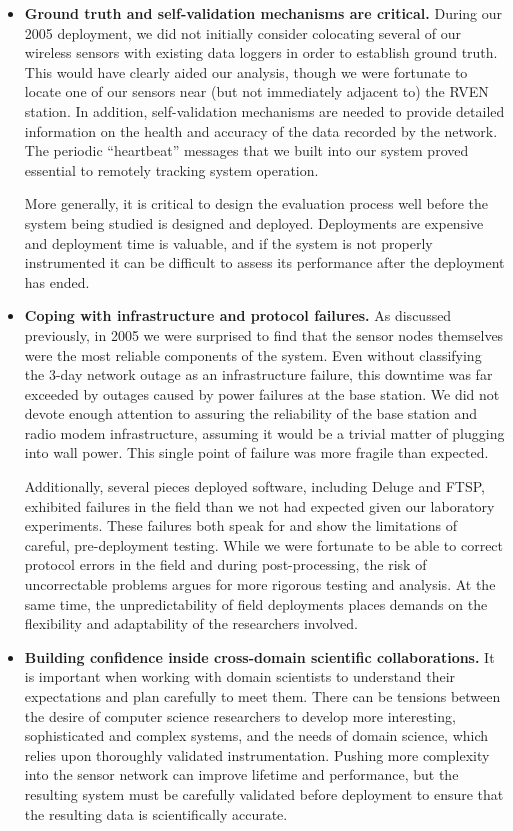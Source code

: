 \begin{itemize}

\item \textbf{Ground truth and self-validation mechanisms are critical.}
During our 2005 deployment, we did not initially consider colocating several
of our wireless sensors with existing data loggers in order to establish
ground truth. This would have clearly aided our analysis, though we were
fortunate to locate one of our sensors near (but not immediately adjacent to)
the RVEN station. In addition, self-validation mechanisms are needed to
provide detailed information on the health and accuracy of the data recorded
by the network. The periodic ``heartbeat'' messages that we built into our
system proved essential to remotely tracking system operation.

More generally, it is critical to design the evaluation process well before
the system being studied is designed and deployed. Deployments are expensive
and deployment time is valuable, and if the system is not properly
instrumented it can be difficult to assess its performance after the
deployment has ended.

\item \textbf{Coping with infrastructure and protocol failures.} As discussed
previously, in 2005 we were surprised to find that the sensor nodes
themselves were the most reliable components of the system. Even without
classifying the 3-day network outage as an infrastructure failure, this
downtime was far exceeded by outages caused by power failures at the base
station. We did not devote enough attention to assuring the reliability of
the base station and radio modem infrastructure, assuming it would be a
trivial matter of plugging into wall power. This single point of failure was
more fragile than expected.

Additionally, several pieces deployed software, including Deluge and FTSP,
exhibited failures in the field than we not had expected given our laboratory
experiments. These failures both speak for and show the limitations of
careful, pre-deployment testing. While we were fortunate to be able to
correct protocol errors in the field and during post-processing, the risk
of uncorrectable problems argues for more rigorous testing and analysis. At
the same time, the unpredictability of field deployments places demands on
the flexibility and adaptability of the researchers involved.

\item \textbf{Building confidence inside cross-domain scientific
collaborations.} It is important when working with domain scientists to
understand their expectations and plan carefully to meet them. There can be
tensions between the desire of computer science researchers to develop more
interesting, sophisticated and complex systems, and the needs of domain
science, which relies upon thoroughly validated instrumentation. Pushing more
complexity into the sensor network can improve lifetime and performance, but
the resulting system must be carefully validated before deployment to ensure
that the resulting data is scientifically accurate.


\end{itemize}
